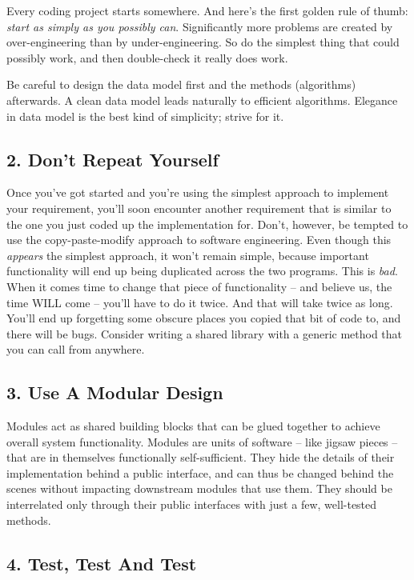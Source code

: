 \documentclass{bmcart}
\begin{document}
Every coding project starts somewhere. And here's the first golden rule of thumb: \textit{start as simply as you possibly can}. Significantly more problems are created by over-engineering than by under-engineering. So do the simplest thing that could possibly work, and then double-check it really does work. 

Be careful to design the data model first and the methods (algorithms) afterwards. A clean data model leads naturally to efficient algorithms. Elegance in data model is the best kind of simplicity; strive for it. 

\subsection*{2. Don't Repeat Yourself}

Once you've got started and you're using the simplest approach to implement your requirement, you'll soon encounter another requirement that is similar to the one you just coded up the implementation for. Don't, however, be tempted to use the copy-paste-modify approach to software engineering. Even though this \textit{appears} the simplest approach, it won't remain simple, because important functionality will end up being duplicated across the two programs. This is \textit{bad}. When it comes time to change that piece of functionality -- and believe us, the time WILL come -- you'll have to do it twice. And that will take twice as long. You'll end up forgetting some obscure places you copied that bit of code to, and there will be bugs. Consider writing a shared library with a generic method that you can call from anywhere.  

\subsection*{3. Use A Modular Design}

Modules act as shared building blocks that can be glued together to achieve overall system functionality. Modules are units of software -- like jigsaw pieces -- that are in themselves functionally self-sufficient. They hide the details of their implementation behind a public interface, and can thus be changed behind the scenes without impacting downstream modules that use them. They should be interrelated only through their public interfaces with just a few, well-tested methods. 

\subsection*{4. Test, Test And Test}
\end{document}
